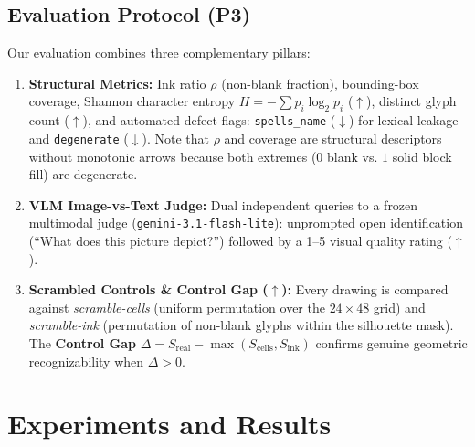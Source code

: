 \documentclass[10pt,twocolumn]{article}
\begin{document}
\subsection{Evaluation Protocol (P3)}
Our evaluation combines three complementary pillars:
\begin{enumerate}
  \item \textbf{Structural Metrics:} Ink ratio $\rho$ (non-blank fraction), bounding-box coverage, Shannon character entropy $H = -\sum p_i \log_2 p_i$ ($\uparrow$), distinct glyph count ($\uparrow$), and automated defect flags: \texttt{spells\_name} ($\downarrow$) for lexical leakage and \texttt{degenerate} ($\downarrow$). Note that $\rho$ and coverage are structural descriptors without monotonic arrows because both extremes ($0$ blank vs. $1$ solid block fill) are degenerate.
  \item \textbf{VLM Image-vs-Text Judge:} Dual independent queries to a frozen multimodal judge (\texttt{gemini-3.1-flash-lite}): unprompted open identification (``What does this picture depict?'') followed by a 1--5 visual quality rating ($\uparrow$).
  \item \textbf{Scrambled Controls \& Control Gap ($\uparrow$):} Every drawing is compared against \emph{scramble-cells} (uniform permutation over the $24 \times 48$ grid) and \emph{scramble-ink} (permutation of non-blank glyphs within the silhouette mask). The \textbf{Control Gap} $\Delta = S_{\text{real}} - \max(S_{\text{cells}}, S_{\text{ink}})$ confirms genuine geometric recognizability when $\Delta > 0$.
\end{enumerate}

\section{Experiments and Results}
\end{document}
